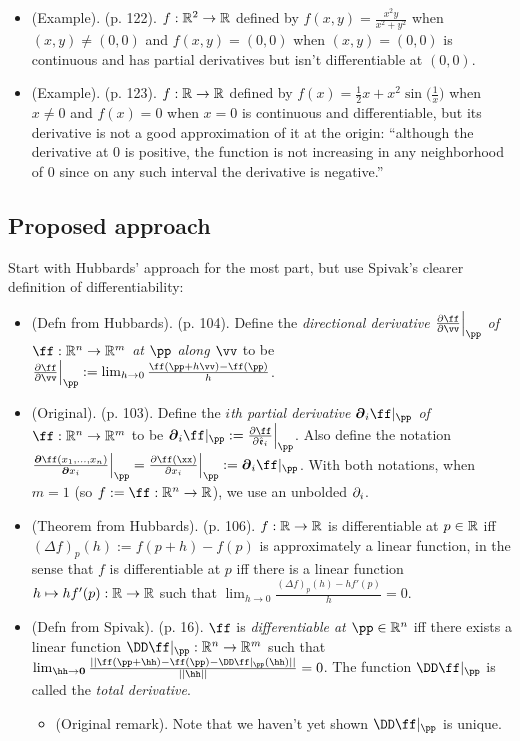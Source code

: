 \begin{itemize}
    \item (Example). (p. 122). $f:\mathbb{R}^2 \rightarrow \mathbb{R}$ defined by $f(x, y) = \frac{x^2 y}{x^2 + y^2}$ when $(x, y) \neq (0, 0)$ and $f(x, y) = (0, 0)$ when $(x, y) = (0, 0)$ is continuous and has partial derivatives but isn't differentiable at $(0, 0)$.
    \item (Example). (p. 123). $f:\mathbb{R} \rightarrow \mathbb{R}$ defined by $f(x) = \frac{1}{2}x + x^2 \sin\Big(\frac{1}{x}\Big)$ when $x \neq 0$ and $f(x) = 0$ when $x = 0$ is continuous and differentiable, but its derivative is not a good approximation of it at the origin: ``although the derivative at $0$ is positive, the function is not increasing in any neighborhood of $0$ since on any such interval the derivative is negative.''
\end{itemize}

\subsection*{Proposed approach}

Start with Hubbards' approach for the most part, but use Spivak's clearer definition of differentiability:
\begin{itemize}
    \item (Defn from Hubbards). (p. 104). Define the \textit{directional derivative $\frac{\pd \ff}{\pd \vv}\Big|_\pp$ of $\ff:\R^n \rightarrow \R^m$ at $\pp$ along $\vv$} to be $\frac{\pd \ff}{\pd \vv}\Big|_\pp := \lim_{h \rightarrow 0} \frac{\ff(\pp + h \vv) - \ff(\pp)}{h}$.
    \item (Original). (p. 103). Define the \textit{$i$th partial derivative $\boldsymbol{\pd}_i \ff|_\pp$ of $\ff:\R^n \rightarrow \R^m$} to be $\boldsymbol{\pd}_i \ff|_\pp := \frac{\pd \ff}{\pd \see_i}\Big|_\pp$. Also define the notation $\frac{\boldsymbol{\pd} \ff(x_1, ..., x_n)}{\boldsymbol{\pd} x_i}\Big|_\pp = \frac{\pd \ff(\xx)}{\pd x_i}\Big|_\pp := \boldsymbol{\pd}_i \ff|_\pp$. With both notations, when $m = 1$ (so $f := \ff:\R^n \rightarrow \R$), we use an unbolded $\partial_i$.
    \item (Theorem from Hubbards). (p. 106). $f: \mathbb{R} \rightarrow \mathbb{R}$ is differentiable at $p \in \mathbb{R}$ iff $(\Delta f)_p(h) := f(p + h) - f(p)$ is approximately a linear function, in the sense that $f$ is differentiable at $p$ iff there is a linear function $h \mapsto hf'(p):\mathbb{R} \rightarrow \mathbb{R}$ such that $\lim_{h \rightarrow 0} \frac{(\Delta f)_p(h) - hf'(p)}{h} = 0$.
    \item (Defn from Spivak). (p. 16). $\ff$ is \textit{differentiable at $\pp \in \R^n$} iff there exists a linear function $\DD \ff|_\pp:\R^n \rightarrow \R^m$ such that $\lim_{\hh \rightarrow \mathbf{0}} \frac{||\ff(\pp + \hh) - \ff(\pp) - \DD \ff|_\pp(\hh)||}{||\hh||} = 0$. The function $\DD \ff|_\pp$ is called the \textit{total derivative}.
    \begin{itemize}
        \item (Original remark). Note that we haven't yet shown $\DD \ff|_\pp$ is unique.
    \end{itemize}
\end{itemize}

